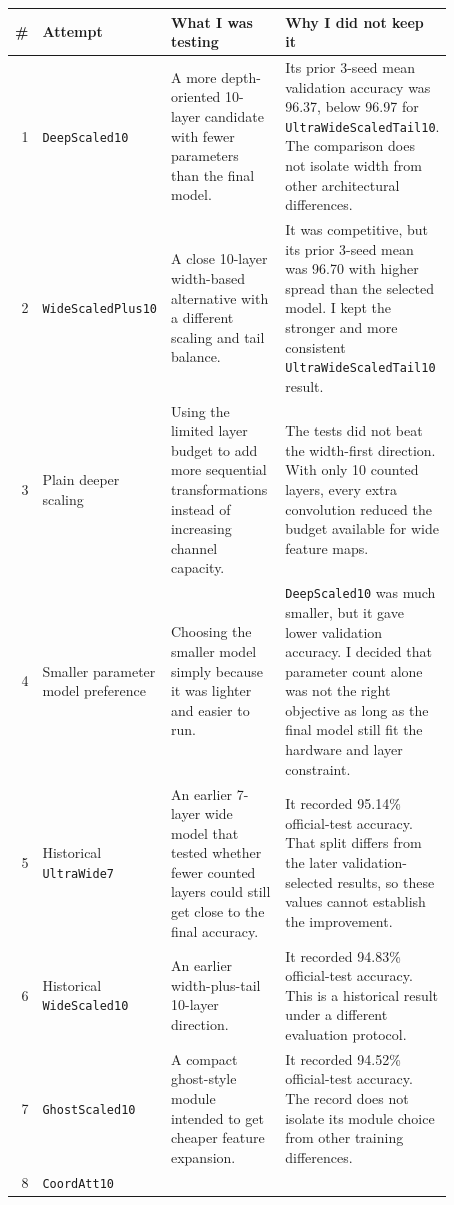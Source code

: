 \documentclass[11pt]{article}
\begin{document}
\begingroup
\small
\renewcommand{\arraystretch}{1.15}
\begin{longtable}{r p{0.20\linewidth} p{0.32\linewidth} p{0.35\linewidth}}
\toprule
\textbf{\#} & \textbf{Attempt} & \textbf{What I was testing} &
\textbf{Why I did not keep it} \\
\midrule
\endhead
1 & \texttt{DeepScaled10} &
A more depth-oriented 10-layer candidate with fewer parameters than the final model. &
Its prior 3-seed mean validation accuracy was 96.37, below 96.97 for
\texttt{UltraWideScaledTail10}. The comparison does not isolate width from other architectural differences. \\
2 & \texttt{WideScaledPlus10} &
A close 10-layer width-based alternative with a different scaling and tail balance. &
It was competitive, but its prior 3-seed mean was 96.70 with higher spread than the
selected model. I kept the stronger and more consistent \texttt{UltraWideScaledTail10}
result. \\
3 & Plain deeper scaling &
Using the limited layer budget to add more sequential transformations instead of
increasing channel capacity. &
The tests did not beat the width-first direction. With only 10 counted layers, every
extra convolution reduced the budget available for wide feature maps. \\
4 & Smaller parameter model preference &
Choosing the smaller model simply because it was lighter and easier to run. &
\texttt{DeepScaled10} was much smaller, but it gave lower validation accuracy. I decided
that parameter count alone was not the right objective as long as the final model still
fit the hardware and layer constraint. \\
5 & Historical \texttt{UltraWide7} &
An earlier 7-layer wide model that tested whether fewer counted layers could still get
close to the final accuracy. &
It recorded 95.14\% official-test accuracy. That split differs from the later validation-selected results, so these values cannot establish the improvement. \\
6 & Historical \texttt{WideScaled10} &
An earlier width-plus-tail 10-layer direction. &
It recorded 94.83\% official-test accuracy. This is a historical result under a different evaluation protocol. \\
7 & \texttt{GhostScaled10} &
A compact ghost-style module intended to get cheaper feature expansion. &
It recorded 94.52\% official-test accuracy. The record does not isolate its module choice from other training differences. \\
8 & \texttt{CoordAtt10} &

\end{longtable}
\end{document}
